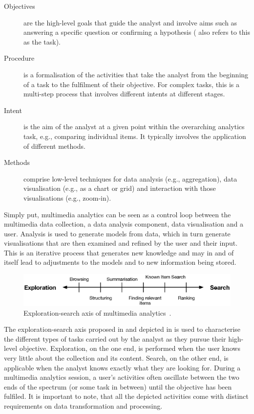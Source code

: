 \begin{description}
    \item[Objectives] are the high-level goals that guide the analyst and involve aims such as answering a specific question or confirming a hypothesis (\cite{Seebacher:2017Visual} also refers to this as the task).
    \item[Procedure] is a formalisation of the activities that take the analyst from the beginning of a task to the fulfilment of their objective. For complex tasks, this is a multi-step process that involves different intents at different stages.
    \item[Intent] is the aim of the analyst at a given point within the overarching analytics task, e.g., comparing individual items. It typically involves the application of different methods.
    \item[Methods] comprise low-level techniques for data analysis (e.g., aggregation), data visualisation (e.g., as a chart or grid) and interaction with those visualisations (e.g., zoom-in).
\end{description}

Simply put, multimedia analytics can be seen as a control loop between the multimedia data collection, a data analysis component, data visualisation and a user. Analysis is used to generate models from data, which in turn generate visualisations that are then examined and refined by the user and their input. This is an iterative process that generates new knowledge and may in and of itself lead to adjustments to the models and to new information being stored.

\begin{figure}[h]
    \centering
    \includegraphics[width=\textwidth]{figures/exploration_search_axis.eps}
    \caption{Exploration-search axis of multimedia analytics~\cite{Zahalka:2014Towards}.}
    \label{figure:exploration-search-axis}
\end{figure}

The exploration-search axis proposed in \cite{Zahalka:2014Towards} and depicted in  is used to characterise the different types of tasks carried out by the analyst as they pursue their high-level objective. Exploration, on the one end, is performed when the user knows very little about the collection and its content. Search, on the other end, is applicable when the analyst knows exactly what they are looking for. During a multimedia analytics session, a user's activities often oscillate between the two ends of the spectrum (or some task in between) until the objective has been fulfiled. It is important to note, that all the depicted activities come with distinct requirements on data transformation and processing.

